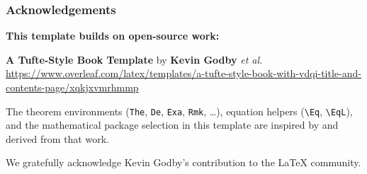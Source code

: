 \documentclass[aspectratio=169,10pt]{beamer}
\begin{document}
\begin{frame}
    \frametitle{Acknowledgements}
    \begin{infobox}
        \textbf{This template builds on open-source work:}
        \medskip

        \textbf{A Tufte-Style Book Template} by \textbf{Kevin Godby} \textit{et al.}\\
        \tiny\url{https://www.overleaf.com/latex/templates/a-tufte-style-book-with-vdqi-title-and-contents-page/xqkjxvmrhmmp}\normalsize
        \medskip

        The theorem environments (\texttt{The}, \texttt{De}, \texttt{Exa}, \texttt{Rmk}, \ldots),
        equation helpers (\texttt{\textbackslash Eq}, \texttt{\textbackslash EqL}), and the
        mathematical package selection in this template are inspired by and derived from
        that work.
    \end{infobox}
    \begin{resultbox}
        We gratefully acknowledge Kevin Godby's contribution to the \LaTeX{} community.
    \end{resultbox}
\end{frame}

\OUCClosingFrame
\end{document}

